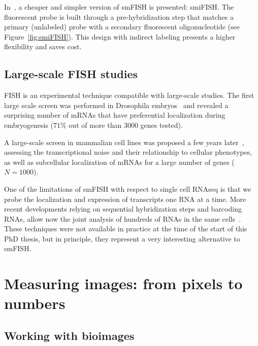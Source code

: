 In~\cite{tsanov_smifish_2016}, a cheaper and simpler version of \ac{smFISH} is presented: \ac{smiFISH}.
The fluorescent probe is built through a pre-hybridization step that matches a primary (unlabeled) probe with a secondary fluorescent oligonucleotide (see Figure~\ref{fig:smiFISH}).
This design with indirect labeling presents a higher flexibility and saves cost.

\subsection{Large-scale FISH studies}
\label{subsec:intro_scale_fish}

FISH is an experimental technique compatible with large-scale studies.
The first large scale screen was performed in Drosophila embryos~\cite{lecuyer_global_2007} and revealed a surprising number of \ac{mRNA}s that have preferential localization during embryogenesis ($71\%$ out of more than 3000 genes tested).

A large-scale screen in mammalian cell lines was proposed a few years later~\cite{battich_image-based_2013, battich_control_2015}, assessing the transcriptional noise and their relationship to cellular phenotypes, as well as subcellular localization of \ac{mRNA}s for a large number of genes ($N = 1000$).

One of the limitations of smFISH with respect to single cell RNAseq is that we probe the localization and expression of transcripts one RNA at a time.
More recent developments relying on sequential hybridization steps and barcoding \ac{RNA}s, allow now the joint analysis of hundreds of \ac{RNA}s in the same cells~\cite{lubeck_single_cell_2014, Chen_2015, eng_seqfish_2019, fazalAtlasSubcellularRNA2019}.
These techniques were not available in practice at the time of the start of this PhD thesis, but in principle, they represent a very interesting alternative to \ac{smFISH}.

\section{Measuring images: from pixels to numbers}
\label{sec:computation_biology}

\subsection{Working with bioimages}
\label{subsec:intro_bioimages}

